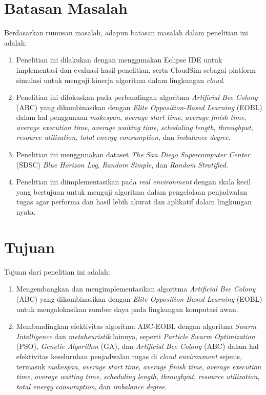 \section{Batasan Masalah}
Berdasarkan rumusan masalah, adapun batasan masalah dalam penelitian ini adalah:
\begin{enumerate} [nolistsep]
    \item Penelitian ini dilakukan dengan menggunakan Eclipse IDE untuk implementasi dan evaluasi hasil penelitian, serta CloudSim sebagai platform simulasi untuk menguji kinerja algoritma dalam lingkungan \textit{cloud}.
    \item Penelitian ini difokuskan pada perbandingan algoritma \textit{Artificial Bee Colony} (ABC) yang dikombinasikan dengan \textit{Elite Opposition-Based Learning} (EOBL) dalam hal penggunaan \textit{makespan},\textit{ average start time}, \textit{average finish time}, \textit{average execution time}, \textit{average waiting time}, \textit{scheduling length}, \textit{throughput}, \textit{resource utilization}, \textit{total energy consumption}, dan \textit{imbalance degree}.
    \item Penelitian ini menggunakan dataset \textit{The San Diego Supercomputer Center} (SDSC) \textit{Blue Horizon Log}, \textit{Random Simple}, dan \textit{Random Stratified}.
    \item Penelitian ini diimplementasikan pada \textit{real environment} dengan skala kecil yang bertujuan untuk menguji algoritma dalam pengelolaan penjadwalan tugas agar performa dan hasil lebih akurat dan aplikatif dalam lingkungan nyata.
\end{enumerate}

\section{Tujuan}
Tujuan dari penelitian ini adalah:
\begin{enumerate} [nolistsep]
    \item Mengembangkan dan mengimplementasikan algoritma \textit{Artificial Bee Colony} (ABC) yang dikombinasikan dengan \textit{Elite Opposition-Based Learning} (EOBL) untuk mengalokasikan sumber daya pada lingkungan komputasi awan.
    \item Membandingkan efektivitas algoritma ABC-EOBL dengan algoritma \textit{Swarm Intelligence} dan \textit{metaheuristik} lainnya, seperti \textit{Particle Swarm Optimization} (PSO), \textit{Genetic Algorithm} (GA), dan \textit{Artificial Bee Colony} (ABC) dalam hal efektivitas keseluruhan penjadwalan tugas di \textit{cloud environment} sejenis, termasuk \textit{makespan},\textit{ average start time}, \textit{average finish time}, \textit{average execution time}, \textit{average waiting time}, \textit{scheduling length}, \textit{throughput}, \textit{resource utilization}, \textit{total energy consumption}, dan \textit{imbalance degree}.
\end{enumerate}

